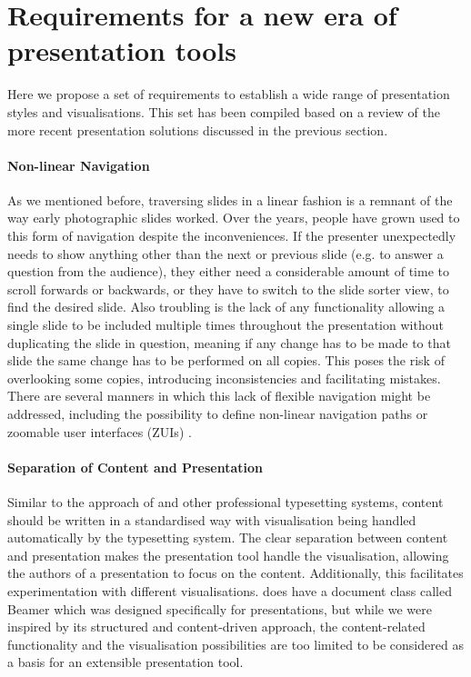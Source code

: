  \section{Requirements for a new era of presentation tools}

   Here we propose a set of requirements to establish a wide range of
   presentation styles and visualisations. This set has been compiled based on
   a review of the more recent presentation solutions discussed in the previous
   section.

     \paragraph{Non-linear Navigation}
     
      As we mentioned before, traversing slides in a linear fashion is a
      remnant of the way early photographic slides worked. Over the years,
      people have grown used to this form of navigation despite the
      inconveniences. If the presenter unexpectedly needs to show anything
      other than the next or previous slide (e.g. to answer a question from the
      audience), they either need a considerable amount of time to scroll
      forwards or backwards, or they have to switch to the slide sorter view,
      to find the desired slide. Also troubling is the lack of any
      functionality allowing a single slide to be included multiple times
      throughout the presentation without duplicating the slide in question,
      meaning if any change has to be made to that slide the same change has to
      be performed on all copies. This poses the risk of overlooking some
      copies, introducing inconsistencies and facilitating mistakes. There are
      several manners in which this lack of flexible navigation might be
      addressed, including the possibility to define non-linear navigation
      paths \citep{spicer-1,edge-1} or zoomable user interfaces (ZUIs)
      \citep{good-1,lichtschlag-1,haller-1}.

     \paragraph{Separation of Content and Presentation}
     
      Similar to the approach of \latex and other professional typesetting
      systems, content should be written in a standardised way with
      visualisation being handled automatically by the typesetting system. The
      clear separation between content and presentation makes the presentation
      tool handle the visualisation, allowing the authors of a presentation to
      focus on the content. Additionally, this facilitates experimentation with
      different visualisations. \latex does have a document class called Beamer
      which was designed specifically for presentations, but while we were
      inspired by its structured and content-driven approach, the
      content-related functionality and the visualisation possibilities are too
      limited to be considered as a basis for an extensible presentation tool.

